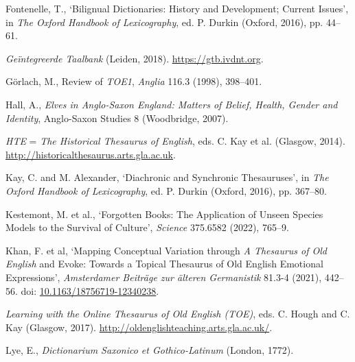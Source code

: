 \begin{list}{}
\item %
Fontenelle, T., `Bilignual Dictionaries: History and Development; Current Issues', in \textit{The Oxford Handbook of Lexicography}, ed. P. Durkin (Oxford, 2016), pp. 44–61.

\item %
\textit{Geïntegreerde Taalbank} (Leiden, 2018). \url{https://gtb.ivdnt.org}.

\item %
Görlach, M., Review of \textit{TOE1}, \textit{Anglia} 116.3 (1998), 398–401.

\item %
Hall, A., \textit{Elves in Anglo-Saxon England: Matters of Belief, Health, Gender and Identity},
Anglo-Saxon Studies 8 (Woodbridge, 2007).

\item %
\textit{HTE} = \textit{The Historical Thesaurus of English}, eds. C. Kay et al. (Glasgow, 2014). \url{http://historicalthesaurus.arts.gla.ac.uk}.

\item %
Kay, C. and M. Alexander, `Diachronic and Synchronic Thesauruses', in \textit{The Oxford Handbook of Lexicography}, ed. P. Durkin (Oxford, 2016), pp. 367–80.

\item %
Kestemont, M. et al., 
`Forgotten Books: The Application of Unseen Species Models to the Survival of Culture', \textit{Science} 375.6582 (2022),
765–9.

\item %
Khan, F. et al, `Mapping Conceptual Variation through \textit{A Thesaurus of Old English} and Evoke: Towards a Topical Thesaurus of Old English Emotional Expressions', \textit{Amsterdamer Beiträge zur älteren Germanistik} 81.3-4 (2021), 442–56. doi: \href{https://doi.org/10.1163/18756719-12340238}{\url{10.1163/18756719-12340238}}.

\item %
\textit{Learning with the Online Thesaurus of Old English (TOE)}, eds. C. Hough and C. Kay (Glasgow, 2017). \url{http://oldenglishteaching.arts.gla.ac.uk/}.

\item
Lye, E., \textit{Dictionarium Saxonico et Gothico-Latinum} (London, 1772).


\end{list}

